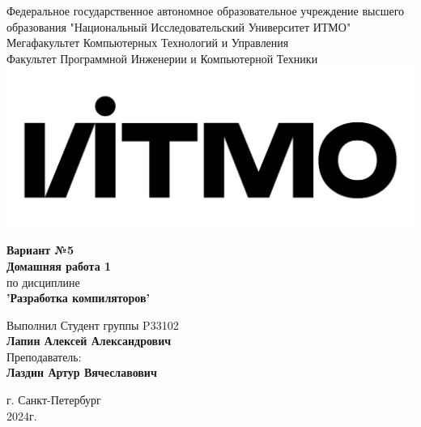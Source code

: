 \documentclass[12pt,onecolumn]{article}
\begin{document}
\setcounter{tocdepth}{4}
\begin{center}
    Федеральное государственное автономное образовательное учреждение высшего образования "Национальный Исследовательский Университет ИТМО"\\ 
    Мегафакультет Компьютерных Технологий и Управления\\
    Факультет Программной Инженерии и Компьютерной Техники \\
    \includegraphics[scale=0.3]{image/itmo.jpg} %
\end{center}
\vspace{1cm}


\begin{center}
    \large \textbf{Вариант №5}\\
    \textbf{Домашняя работа 1}\\
    по дисциплине\\
    \textbf{'Разработка компиляторов'}
\end{center}

\vspace{2cm}

\begin{flushright}
  Выполнил Студент  группы P33102\\
  \textbf{Лапин Алексей Александрович}\\
  Преподаватель: \\
  \textbf{Лаздин Артур Вячеславович}\\
\end{flushright}

\vspace{9cm}
\begin{center}
    г. Санкт-Петербург\\
    2024г.
\end{center}
\pagestyle{empty}

\newpage
\tableofcontents
\newpage
\end{document}
